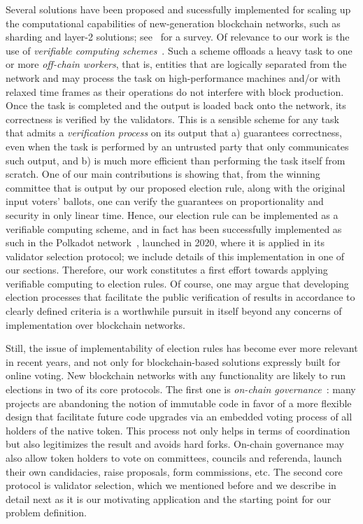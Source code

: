 Several solutions have been proposed and sucessfully implemented for scaling up the computational capabilities of new-generation blockchain networks, such as sharding and layer-2 solutions; see~\cite{zhou2020solutions} for a survey. Of relevance to our work is the use of \emph{verifiable computing schemes}~\cite{gennaro2010non}. Such a scheme offloads a heavy task to one or more \emph{off-chain workers}, that is, entities that are logically separated from the network and may process the task on high-performance machines and/or with relaxed time frames as their operations do not interfere with block production. Once the task is completed and the output is loaded back onto the network, its correctness is verified by the validators. 
This is a sensible scheme for any task that admits a \emph{verification process} on its output that a) guarantees correctness, even when the task is performed by an untrusted party that only communicates such output, and b) is much more efficient than performing the task itself from scratch. One of our main contributions is showing that, from the winning committee that is output by our proposed election rule, along with the original input voters' ballots, one can verify the guarantees on proportionality and security in only linear time. Hence, our election rule can be implemented as a verifiable computing scheme, and in fact has been successfully implemented as such in the Polkadot network~\cite{burdges2020overview}, launched in 2020, where it is applied in its validator selection protocol; we include details of this implementation in one of our sections. Therefore, our work constitutes a first effort towards applying verifiable computing to election rules. Of course, one may argue that developing election processes that facilitate the public verification of results in accordance to clearly defined criteria is a worthwhile pursuit in itself beyond any concerns of implementation over blockchain networks.

Still, the issue of implementability of election rules has become ever more relevant in recent years, and not only for blockchain-based solutions expressly built for online voting. New blockchain networks with any functionality are likely to run elections in two of its core protocols. 
The first one is \emph{on-chain governance}~\cite{beck2018governance}: many projects are abandoning the notion of immutable code in favor of a more flexible design that facilitate future code upgrades via an embedded voting process of all holders of the native token. This process not only helps in terms of coordination but also legitimizes the result and avoids hard forks. On-chain governance may also allow token holders to vote on committees, councils and referenda, launch their own candidacies, raise proposals, form commissions, etc. 
The second core protocol is validator selection, which we mentioned before and we describe in detail next as it is our motivating application and the starting point for our problem definition. 

